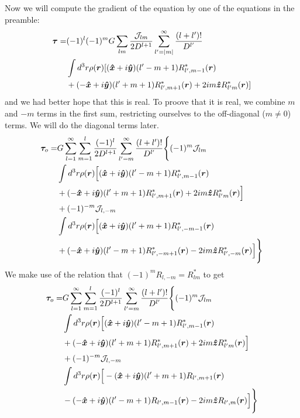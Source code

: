 \documentclass[aps,twocolumn,secnumarabic,balancelastpage,amsmath,amssymb,nofootinbib,floatfix]{revtex4-1}
\begin{document}
Now we will compute the gradient of the equation by one of the equations in the preamble:
\begin{equation*}
\begin{aligned}
\bm \tau = &(-1)^l (-1)^m G\sum_{lm}  \frac{\mathcal{J}_{lm}}{2D^{l+1}}\sum_{l'=|m|}^\infty \frac{(l+l')!}{D^{l'}}\\
& \int d^3 r\rho(\bm r)[(\bm{\hat x} + i\bm{\hat y})(l'-m+1)R^*_{l',m-1}(\bm r)\\
&+(-\bm{\hat x}+i\bm{\hat y})(l'+m+1)R^*_{l',m+1}(\bm r)+2im\bm{\hat z} R^*_{l'm}(\bm r)]
\end{aligned}
\end{equation*}
and we had better hope that this is real. To proove that it is real, we combine $m$ and $-m$ terms in the first sum, restricting ourselves to the off-diagonal ($m \neq 0$) terms. We will do the diagonal terms later.
\begin{equation*}
\begin{aligned}
\bm \tau_o = &G\sum_{l=1}^\infty \sum_{m=1}^l \frac{(-1)^l}{2D^{l+1}}\sum_{l'=m}^\infty \frac{(l+l')!}{D^{l'}}\Bigg\{(-1)^m \mathcal{J}_{lm}\\
& \int d^3 r\rho(\bm r)\Big[(\bm{\hat x} + i\bm{\hat y})(l'-m+1)R^*_{l',m-1}(\bm r)\\
&+(-\bm{\hat x}+i\bm{\hat y})(l'+m+1)R^*_{l',m+1}(\bm r)+2im\bm{\hat z} R^*_{l'm}(\bm r)\Big] \\
&+ (-1)^{-m} \mathcal{J}_{l,-m}\\
&\int d^3 r\rho(\bm r)\Big[(\bm{\hat x} + i\bm{\hat y})(l'+m+1)R^*_{l',-m-1}(\bm r)\\
&+(-\bm{\hat x}+i\bm{\hat y})(l'-m+1)R^*_{l',-m+1}(\bm r)-2im\bm{\hat z} R^*_{l',-m}(\bm r)\Big]\Bigg\}
\end{aligned}
\end{equation*}
We make use of the relation that $(-1)^m R_{l,-m}=R^*_{lm}$ to get
\begin{equation*}
\begin{aligned}
\bm \tau_o = &G\sum_{l=1}^\infty \sum_{m=1}^l \frac{(-1)^l}{2D^{l+1}}\sum_{l'=m}^\infty \frac{(l+l')!}{D^{l'}}\Bigg\{(-1)^m \mathcal{J}_{lm}\\
& \int d^3 r\rho(\bm r)\Big[(\bm{\hat x} + i\bm{\hat y})(l'-m+1)R^*_{l',m-1}(\bm r)\\
&+(-\bm{\hat x}+i\bm{\hat y})(l'+m+1)R^*_{l',m+1}(\bm r)+2im\bm{\hat z} R^*_{l'm}(\bm r)\Big] \\
&+ (-1)^{-m} \mathcal{J}_{l,-m}\\
&\int d^3 r\rho(\bm r)\Big[-(\bm{\hat x} + i\bm{\hat y})(l'+m+1)R_{l',m+1}(\bm r)\\
&-(-\bm{\hat x}+i\bm{\hat y})(l'-m+1)R_{l',m-1}(\bm r)-2im\bm{\hat z} R_{l',m}(\bm r)\Big]\Bigg\}
\end{aligned}
\end{equation*}
\end{document}
